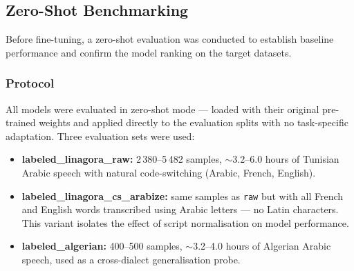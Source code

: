 \documentclass[12pt,a4paper]{report}
\begin{document}
\begin{itemize}

\end{itemize}

\medskip
\subsection{Zero-Shot Benchmarking}

Before fine-tuning, a zero-shot evaluation was conducted to establish baseline performance
and confirm the model ranking on the target datasets.

\subsubsection*{Protocol}

All models were evaluated in zero-shot mode --- loaded with their original pre-trained weights
and applied directly to the evaluation splits with no task-specific adaptation.
Three evaluation sets were used:
\begin{itemize}
    \item \textbf{labeled\_linagora\_raw:} 2\,380--5\,482 samples, $\sim$3.2--6.0 hours of
    Tunisian Arabic speech with natural code-switching (Arabic, French, English).
    \item \textbf{labeled\_linagora\_cs\_arabize:} same samples as \texttt{raw} but with all
    French and English words transcribed using Arabic letters --- no Latin characters. This
    variant isolates the effect of script normalisation on model performance.
    \item \textbf{labeled\_algerian:} 400--500 samples, $\sim$3.2--4.0 hours of Algerian
    Arabic speech, used as a cross-dialect generalisation probe.
\end{itemize}
\end{document}

